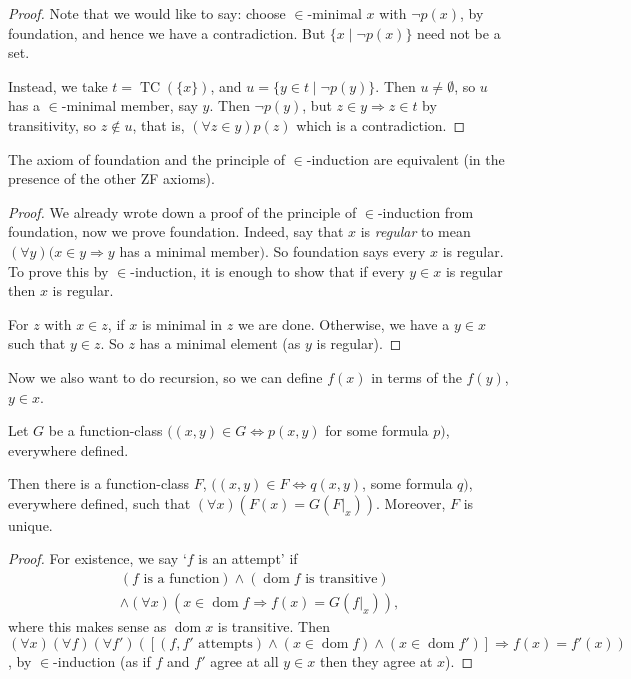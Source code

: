 \documentclass[a3paper, 10pt]{article}
\newcommand{\dom}{\operatorname{dom}}
\begin{document}
\begin{multicols*}{5}
\begin{proof}
  Note that we would like to say: choose $\in$-minimal $x$ with $\lnot p(x)$, by foundation, and hence we have a contradiction. But $\{x \mid \lnot p(x)\}$ need not be a set.

  Instead, we take $t = \operatorname{TC}(\{x\})$, and $u = \{y \in t\mid \lnot p(y)\}$. Then $u \neq \emptyset$, so $u$ has a $\in$-minimal member, say $y$. Then $\lnot p(y)$, but $z \in y \Rightarrow z \in t$ by transitivity, so $z \not \in u$, that is, $(\forall z \in y)p(z)$ which is a contradiction.
\end{proof}

\begin{theorem}
  The axiom of foundation and the principle of $\in$-induction are equivalent (in the presence of the other ZF axioms).
\end{theorem}
\begin{proof}
  We already wrote down a proof of the principle of $\in$-induction from foundation, now we prove foundation. Indeed, say that $x$ is \emph{regular} to mean $(\forall y)(x \in y \Rightarrow y$ has a minimal member$)$. So foundation says every $x$ is regular. To prove this by $\in$-induction, it is enough to show that if every $y \in x$ is regular then $x$ is regular. 

  For $z$ with $x \in z$, if $x$ is minimal in $z$ we are done. Otherwise, we have a $y\in x$ such that $y \in z$. So $z$ has a minimal element (as $y$ is regular).
\end{proof}

Now we also want to do recursion, so we can define $f(x)$ in terms of the $f(y)$, $y \in x$.

\begin{theorem}
Let $G$ be a function-class $((x, y) \in G \Leftrightarrow p(x, y)$ for some formula $p)$, everywhere defined.

Then there is a function-class $F$, $((x, y) \in F \Leftrightarrow q(x, y)$, some formula $q)$, everywhere defined, such that $(\forall x)(F(x) = G(\left.F\right|_x))$. Moreover, $F$ is unique.
\end{theorem}
\begin{proof}
  For existence, we say `$f$ is an attempt' if
  \begin{align*}
    (f\text{ is a function}) \land (\dom f\text{ is transitive}) \\
    \land (\forall x)(x \in \dom f \Rightarrow f(x) = G(\left.f\right|_x)),
  \end{align*}
  where this makes sense as $\dom x$ is transitive.
  Then $(\forall x)(\forall f)(\forall f')([(f, f'\text{ attempts}) \land (x \in \dom f) \land (x \in \dom f')]\Rightarrow f(x) = f'(x))$, by $\in$-induction (as if $f$ and $f'$ agree at all $y \in x$ then they agree at $x$).


\end{proof}
\end{multicols*}
\end{document}
